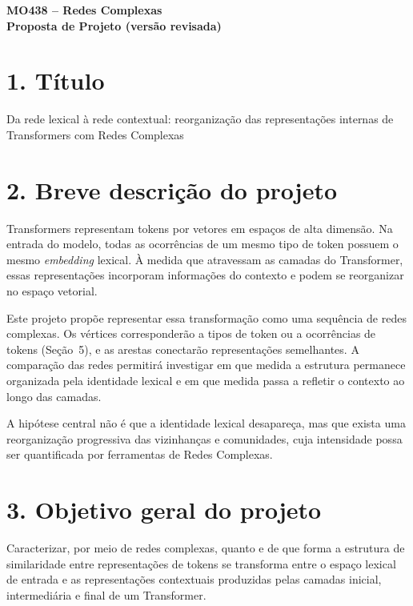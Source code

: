 \documentclass[11pt,a4paper]{article}
\begin{document}
\begin{center}
    {\large\bfseries MO438 -- Redes Complexas}\\[2pt]
    \textbf{Proposta de Projeto (versão revisada)}
\end{center}

\vspace{-2mm}

\section*{1. Título}

Da rede lexical à rede contextual: reorganização das representações
internas de Transformers com Redes Complexas

\section*{2. Breve descrição do projeto}

Transformers representam tokens por vetores em espaços de alta dimensão. Na
entrada do modelo, todas as ocorrências de um mesmo tipo de token possuem o
mesmo \textit{embedding} lexical. À medida que atravessam as camadas do
Transformer, essas representações incorporam informações do contexto e podem se
reorganizar no espaço vetorial.

Este projeto propõe representar essa transformação como uma sequência de
redes complexas. Os vértices corresponderão a tipos de token ou a ocorrências
de tokens (Seção~5), e as arestas conectarão representações semelhantes. A
comparação das redes permitirá investigar em que medida a estrutura permanece
organizada pela identidade lexical e em que medida passa a refletir o
contexto ao longo das camadas.

A hipótese central não é que a identidade lexical desapareça, mas que exista
uma reorganização progressiva das vizinhanças e comunidades, cuja intensidade
possa ser quantificada por ferramentas de Redes Complexas.

\section*{3. Objetivo geral do projeto}

Caracterizar, por meio de redes complexas, quanto e de que forma a estrutura
de similaridade entre representações de tokens se transforma entre o espaço
lexical de entrada e as representações contextuais produzidas pelas camadas
inicial, intermediária e final de um Transformer.
\end{document}
